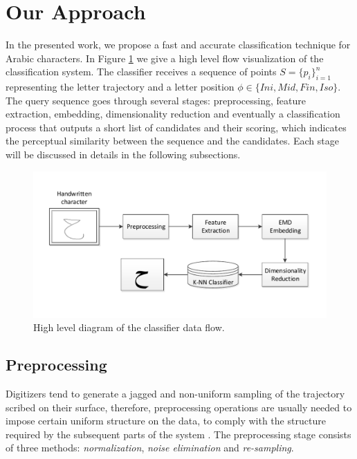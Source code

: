 \documentclass[10pt, conference, compsocconf]{IEEEtran}
\begin{document}
\section{Our Approach}
\label{sec:approach}
In the presented work, we propose a fast and accurate classification technique for Arabic characters.
In Figure \ref{fig:letters_classifier_learning_flow} we give a high level flow visualization of the classification system.
The classifier receives a sequence of points $S=\{p_{i}\}_{i=1}^{n}$ representing the letter trajectory and a letter position $\phi \in \{Ini, Mid, Fin, Iso\}$.
The query sequence goes through several stages: preprocessing, feature extraction, embedding, dimensionality reduction and eventually a classification process that outputs a short list of candidates and their scoring, which indicates the perceptual similarity between the sequence and the candidates. 
Each stage will be discussed in details in the following subsections.

\begin{figure}
\centering
\includegraphics[width=1\columnwidth]{./figures/letters_classifier_learning_flow2}       
\caption{High level diagram of the classifier data flow.}
\label{fig:letters_classifier_learning_flow}
\end{figure}
 
\subsection{Preprocessing}
Digitizers tend to generate a jagged and non-uniform sampling of the trajectory scribed on their surface, therefore, preprocessing operations are usually needed to impose certain uniform structure on the data, to comply with the structure required by the subsequent parts of the system \cite{al2011online}. 
The preprocessing stage consists of three methods: \emph{normalization}, \emph{noise elimination} and \emph{re-sampling}.
\end{document}
